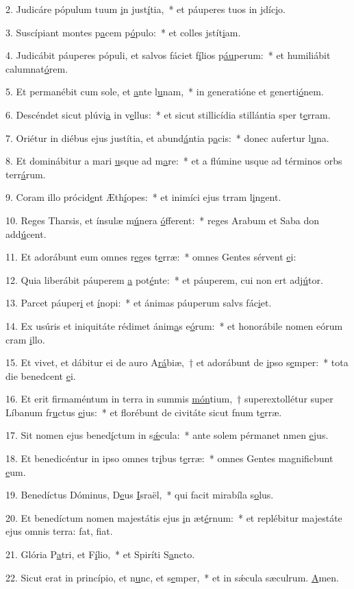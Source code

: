 2. Judicáre pópulum tuum \uline{i}n just\uline{í}tia,~* et páuperes tuos in jdíc\uline{i}o.\par 
3. Suscípiant montes p\uline{a}cem p\uline{ó}pulo:~* et colles jstít\uline{i}am.\par 
4. Judicábit páuperes pópuli, et salvos fáciet f\uline{í}lios p\uline{áu}perum:~* et humiliábit calumnat\uline{ó}rem.\par 
5. Et permanébit cum sole, et \uline{a}nte l\uline{u}nam,~* in generatióne et generti\uline{ó}nem.\par 
6. Descéndet sicut plúvi\uline{a} in v\uline{e}llus:~* et sicut stillicídia stillántia sper t\uline{e}rram.\par 
7. Oriétur in diébus ejus justítia, et abund\uline{á}ntia p\uline{a}cis:~* donec aufertur l\uline{u}na.\par 
8. Et dominábitur a mari \uline{u}sque ad m\uline{a}re:~* et a flúmine usque ad términos orbs terr\uline{á}rum.\par 
9. Coram illo prócid\uline{e}nt Æth\uline{í}opes:~* et inimíci ejus trram l\uline{i}ngent.\par 
10. Reges Tharsis, et ínsulæ m\uline{ú}nera \uline{ó}fferent:~* reges Arabum et Saba don add\uline{ú}cent.\par 
11. Et adorábunt eum omnes r\uline{e}ges t\uline{e}rræ:~* omnes Gentes sérvent \uline{e}i:\par 
12. Quia liberábit páuperem \uline{a} pot\uline{é}nte:~* et páuperem, cui non ert adj\uline{ú}tor.\par 
13. Parcet páuper\uline{i} et \uline{í}nopi:~* et ánimas páuperum salvs fác\uline{i}et.\par 
14. Ex usúris et iniquitáte rédimet ánim\uline{a}s e\uline{ó}rum:~* et honorábile nomen eórum cram \uline{i}llo.\par 
15. Et vivet, et dábitur ei de auro A\uline{rá}biæ,~† et adorábunt de \uline{i}pso s\uline{e}mper:~* tota die benedcent \uline{e}i.\par 
16. Et erit firmaméntum in terra in summis \uline{món}tium,~† superextollétur super Líbanum fr\uline{u}ctus \uline{e}jus:~* et florébunt de civitáte sicut fnum t\uline{e}rræ.\par 
17. Sit nomen ejus bened\uline{í}ctum in s\uline{ǽ}cula:~* ante solem pérmanet nmen \uline{e}jus.\par 
18. Et benedicéntur in ipso omnes tr\uline{i}bus t\uline{e}rræ:~* omnes Gentes magnificbunt \uline{e}um.\par 
19. Benedíctus Dóminus, D\uline{e}us \uline{I}sraël,~* qui facit mirabíla s\uline{o}lus.\par 
20. Et benedíctum nomen majestátis ejus \uline{i}n æt\uline{é}rnum:~* et replébitur majestáte ejus omnis terra: fat, f\uline{i}at.\par 
21. Glória P\uline{a}tri, et F\uline{í}lio,~* et Spiríti S\uline{a}ncto.\par 
22. Sicut erat in princípio, et n\uline{u}nc, et s\uline{e}mper,~* et in sǽcula sæculrum. \uline{A}men.\par 
